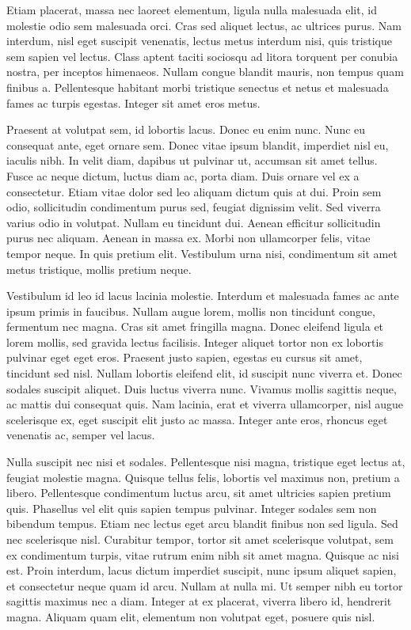 Etiam placerat, massa nec laoreet elementum, ligula nulla malesuada elit, id molestie odio sem malesuada orci. Cras sed aliquet lectus, ac ultrices purus. Nam interdum, nisl eget suscipit venenatis, lectus metus interdum nisi, quis tristique sem sapien vel lectus. Class aptent taciti sociosqu ad litora torquent per conubia nostra, per inceptos himenaeos. Nullam congue blandit mauris, non tempus quam finibus a. Pellentesque habitant morbi tristique senectus et netus et malesuada fames ac turpis egestas. Integer sit amet eros metus.

Praesent at volutpat sem, id lobortis lacus. Donec eu enim nunc. Nunc eu consequat ante, eget ornare sem. Donec vitae ipsum blandit, imperdiet nisl eu, iaculis nibh. In velit diam, dapibus ut pulvinar ut, accumsan sit amet tellus. Fusce ac neque dictum, luctus diam ac, porta diam. Duis ornare vel ex a consectetur. Etiam vitae dolor sed leo aliquam dictum quis at dui. Proin sem odio, sollicitudin condimentum purus sed, feugiat dignissim velit. Sed viverra varius odio in volutpat. Nullam eu tincidunt dui. Aenean efficitur sollicitudin purus nec aliquam. Aenean in massa ex. Morbi non ullamcorper felis, vitae tempor neque. In quis pretium elit. Vestibulum urna nisi, condimentum sit amet metus tristique, mollis pretium neque.

Vestibulum id leo id lacus lacinia molestie. Interdum et malesuada fames ac ante ipsum primis in faucibus. Nullam augue lorem, mollis non tincidunt congue, fermentum nec magna. Cras sit amet fringilla magna. Donec eleifend ligula et lorem mollis, sed gravida lectus facilisis. Integer aliquet tortor non ex lobortis pulvinar eget eget eros. Praesent justo sapien, egestas eu cursus sit amet, tincidunt sed nisl. Nullam lobortis eleifend elit, id suscipit nunc viverra et. Donec sodales suscipit aliquet. Duis luctus viverra nunc. Vivamus mollis sagittis neque, ac mattis dui consequat quis. Nam lacinia, erat et viverra ullamcorper, nisl augue scelerisque ex, eget suscipit elit justo ac massa. Integer ante eros, rhoncus eget venenatis ac, semper vel lacus.

Nulla suscipit nec nisi et sodales. Pellentesque nisi magna, tristique eget lectus at, feugiat molestie magna. Quisque tellus felis, lobortis vel maximus non, pretium a libero. Pellentesque condimentum luctus arcu, sit amet ultricies sapien pretium quis. Phasellus vel elit quis sapien tempus pulvinar. Integer sodales sem non bibendum tempus. Etiam nec lectus eget arcu blandit finibus non sed ligula. Sed nec scelerisque nisl. Curabitur tempor, tortor sit amet scelerisque volutpat, sem ex condimentum turpis, vitae rutrum enim nibh sit amet magna. Quisque ac nisi est. Proin interdum, lacus dictum imperdiet suscipit, nunc ipsum aliquet sapien, et consectetur neque quam id arcu. Nullam at nulla mi. Ut semper nibh eu tortor sagittis maximus nec a diam. Integer at ex placerat, viverra libero id, hendrerit magna. Aliquam quam elit, elementum non volutpat eget, posuere quis nisl.

